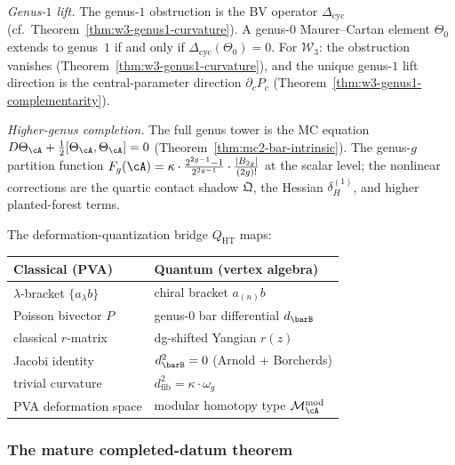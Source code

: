 \emph{Genus-$1$ lift.}
The genus-$1$ obstruction is the BV operator
$\Delta_{\mathrm{cyc}}$
(cf.\ Theorem~\ref{thm:w3-genus1-curvature}).
A genus-$0$ Maurer--Cartan element $\Theta_0$ extends to
genus~$1$ if and only if
$\Delta_{\mathrm{cyc}}(\Theta_0)=0$.
For $\mathcal W_3$: the obstruction vanishes
(Theorem~\ref{thm:w3-genus1-curvature}), and the unique genus-$1$ lift
direction is the central-parameter direction $\partial_c P_c$
(Theorem~\ref{thm:w3-genus1-complementarity}).

\emph{Higher-genus completion.}
The full genus tower is the MC equation
$D\Theta_\cA+\tfrac12[\Theta_\cA,\Theta_\cA]=0$
(Theorem~\ref{thm:mc2-bar-intrinsic}). The genus-$g$
partition function $F_g(\cA)=\kappa\cdot\tfrac{2^{2g-1}-1}{2^{2g-1}}\cdot\tfrac{|B_{2g}|}{(2g)!}$
at the scalar level; the nonlinear corrections are the
quartic contact shadow $\mathfrak Q$, the Hessian
$\delta_H^{(1)}$, and higher planted-forest terms.

The deformation-quantization bridge $Q_{\mathrm{HT}}$ maps:
\begin{center}
\renewcommand{\arraystretch}{1.15}
\begin{tabular}{ll}
\textbf{Classical (PVA)} & \textbf{Quantum (vertex algebra)} \\
\hline
$\lambda$-bracket $\{a_\lambda b\}$
 & chiral bracket $a_{(n)}b$ \\
Poisson bivector $P$
 & genus-$0$ bar differential $d_{\barB}$ \\
classical $r$-matrix
 & dg-shifted Yangian $r(z)$ \\
Jacobi identity
 & $d_{\barB}^2=0$ (Arnold + Borcherds) \\
trivial curvature
 & $d_{\mathrm{fib}}^2=\kappa\cdot\omega_g$ \\
PVA deformation space
 & modular homotopy type $\mathcal M^{\mathrm{mod}}_\cA$
\end{tabular}
\end{center}

\subsubsection{The mature completed-datum theorem}

